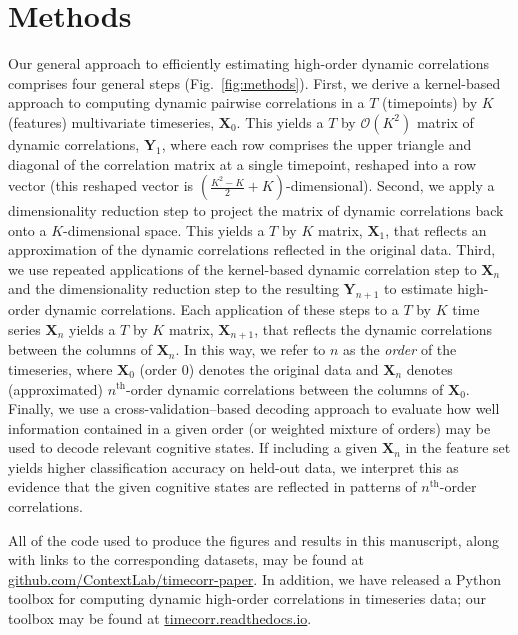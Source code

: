 \documentclass[english]{article}
\begin{document}
\section*{Methods}
Our general approach to efficiently estimating high-order dynamic
correlations comprises four general steps (Fig.~\ref{fig:methods}).
First, we derive a kernel-based approach to computing dynamic pairwise
correlations in a $T$ (timepoints) by $K$ (features) multivariate
timeseries, $\mathbf{X}_0$.  This yields a $T$ by $\mathcal{O}(K^2)$
matrix of dynamic correlations, $\mathbf{Y}_1$, where each row
comprises the upper triangle and diagonal of the correlation matrix at a single
timepoint, reshaped into a row vector (this reshaped vector is
$\left( \frac{K^2 - K}{2} + K \right)$-dimensional).  Second, we apply a dimensionality
reduction step to project the matrix of dynamic correlations back onto
a $K$-dimensional space.  This yields a $T$ by $K$ matrix,
$\mathbf{X}_1$, that reflects an approximation of the dynamic
correlations reflected in the original data.  Third, we use repeated
applications of the kernel-based dynamic correlation step to
$\mathbf{X}_n$ and the dimensionality reduction step to the resulting
$\mathbf{Y}_{n+1}$ to estimate high-order dynamic correlations.  Each
application of these steps to a $T$ by $K$ time series $\mathbf{X}_n$
yields a $T$ by $K$ matrix, $\mathbf{X}_{n+1}$, that reflects the
dynamic correlations between the columns of $\mathbf{X}_n$.  In this
way, we refer to $n$ as the \textit{order} of the timeseries, where
$\mathbf{X}_0$ (order 0) denotes the original data and $\mathbf{X}_n$
denotes (approximated) $n^\mathrm{th}$-order dynamic correlations
between the columns of $\mathbf{X}_0$.  Finally, we use a
cross-validation--based decoding approach to evaluate how well
information contained in a given order (or weighted mixture of orders)
may be used to decode relevant cognitive states.  If including a given
$\mathbf{X}_n$ in the feature set yields higher classification
accuracy on held-out data, we interpret this as evidence that the
given cognitive states are reflected in patterns of
$n^\mathrm{th}$-order correlations.

All of the code used to produce
the figures and results in this manuscript, along with links to the
corresponding datasets, may be found at
\href{https://github.com/ContextLab/timecorr-paper}{github.com/ContextLab/timecorr-paper}.
In addition, we have released a Python toolbox for computing dynamic
high-order correlations in timeseries data; our toolbox may be found
at
\href{https://timecorr.readthedocs.io/}{timecorr.readthedocs.io}.
\end{document}
